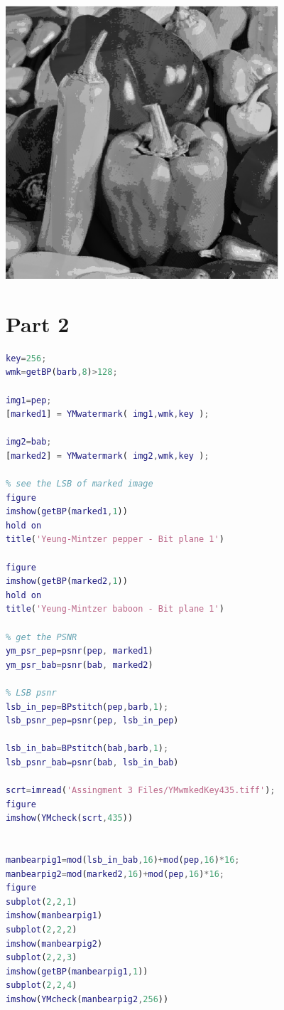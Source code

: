 \documentclass{article}
\begin{document}
\includegraphics [width=4in]{lab3_04.eps}


\section{Part 2}

\begin{lstlisting}[language=Matlab]
key=256;
wmk=getBP(barb,8)>128;

img1=pep;
[marked1] = YMwatermark( img1,wmk,key );

img2=bab;
[marked2] = YMwatermark( img2,wmk,key );

% see the LSB of marked image
figure
imshow(getBP(marked1,1))
hold on
title('Yeung-Mintzer pepper - Bit plane 1')

figure
imshow(getBP(marked2,1))
hold on
title('Yeung-Mintzer baboon - Bit plane 1')

% get the PSNR
ym_psr_pep=psnr(pep, marked1)
ym_psr_bab=psnr(bab, marked2)

% LSB psnr
lsb_in_pep=BPstitch(pep,barb,1);
lsb_psnr_pep=psnr(pep, lsb_in_pep)

lsb_in_bab=BPstitch(bab,barb,1);
lsb_psnr_bab=psnr(bab, lsb_in_bab)

scrt=imread('Assingment 3 Files/YMwmkedKey435.tiff');
figure
imshow(YMcheck(scrt,435))


manbearpig1=mod(lsb_in_bab,16)+mod(pep,16)*16;
manbearpig2=mod(marked2,16)+mod(pep,16)*16;
figure
subplot(2,2,1)
imshow(manbearpig1)
subplot(2,2,2)
imshow(manbearpig2)
subplot(2,2,3)
imshow(getBP(manbearpig1,1))
subplot(2,2,4)
imshow(YMcheck(manbearpig2,256))
\end{lstlisting}
\end{document}
